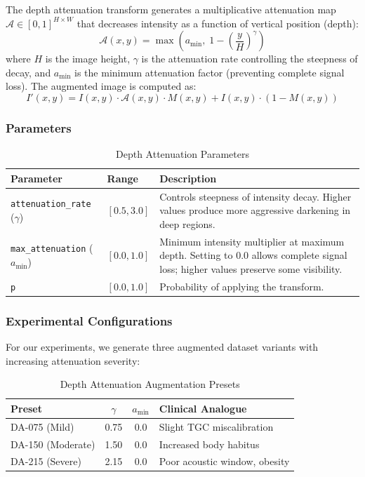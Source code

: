 \documentclass{article}
\theoremstyle{plain}
\theoremstyle{definition}
\theoremstyle{remark}
\begin{document}
The depth attenuation transform generates a multiplicative attenuation map $\mathcal{A} \in [0, 1]^{H \times W}$ that decreases intensity as a function of vertical position (depth):
\begin{equation}
    \mathcal{A}(x, y) = \max\left( a_{\min}, \; 1 - \left(\frac{y}{H}\right)^{\gamma} \right)
\end{equation}
where $H$ is the image height, $\gamma$ is the attenuation rate controlling the steepness of decay, and $a_{\min}$ is the minimum attenuation factor (preventing complete signal loss). The augmented image is computed as:
\begin{equation}
    I'(x, y) = I(x, y) \cdot \mathcal{A}(x, y) \cdot M(x, y) + I(x, y) \cdot (1 - M(x, y))
\end{equation}

\subsubsection{Parameters}

\begin{table}[h]
\centering
\caption{Depth Attenuation Parameters}
\label{tab:depth_attenuation_params}
\begin{tabular}{@{}llp{7cm}@{}}
\toprule
\textbf{Parameter} & \textbf{Range} & \textbf{Description} \\
\midrule
\texttt{attenuation\_rate} ($\gamma$) & $[0.5, 3.0]$ & Controls steepness of intensity decay. Higher values produce more aggressive darkening in deep regions. \\
\texttt{max\_attenuation} ($a_{\min}$) & $[0.0, 1.0]$ & Minimum intensity multiplier at maximum depth. Setting to 0.0 allows complete signal loss; higher values preserve some visibility. \\
\texttt{p} & $[0.0, 1.0]$ & Probability of applying the transform. \\
\bottomrule
\end{tabular}
\end{table}

\subsubsection{Experimental Configurations}

For our experiments, we generate three augmented dataset variants with increasing attenuation severity:

\begin{table}[h]
\centering
\caption{Depth Attenuation Augmentation Presets}
\label{tab:depth_attenuation_presets}
\begin{tabular}{@{}lccl@{}}
\toprule
\textbf{Preset} & \textbf{$\gamma$} & \textbf{$a_{\min}$} & \textbf{Clinical Analogue} \\
\midrule
DA-075 (Mild) & 0.75 & 0.0 & Slight TGC miscalibration \\
DA-150 (Moderate) & 1.50 & 0.0 & Increased body habitus \\
DA-215 (Severe) & 2.15 & 0.0 & Poor acoustic window, obesity \\
\bottomrule
\end{tabular}
\end{table}
\end{document}
